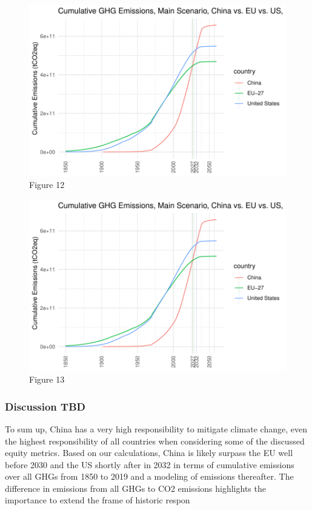 \documentclass[
  12pt,
]{article}
\numberwithin{equation}{section}
\numberwithin{table}{section}
\numberwithin{figure}{section}
\begin{document}
\begin{figure}
\centering
\includegraphics{Paper_files/figure-latex/unnamed-chunk-12-1.pdf}
\caption{Figure 12}
\end{figure}

\begin{figure}
\centering
\includegraphics{Paper_files/figure-latex/unnamed-chunk-13-1.pdf}
\caption{Figure 13}
\end{figure}

\hypertarget{discussion-tbd}{%
\subsubsection{Discussion TBD}\label{discussion-tbd}}

To sum up, China has a very high responsibility to mitigate climate
change, even the highest responsibility of all countries when
considering some of the discussed equity metrics. Based on our
calculations, China is likely surpass the EU well before 2030 and the US
shortly after in 2032 in terms of cumulative emissions over all GHGs
from 1850 to 2019 and a modeling of emissions thereafter. The difference
in emissions from all GHGs to CO2 emissions highlights the importance to
extend the frame of historic respon
\end{document}
